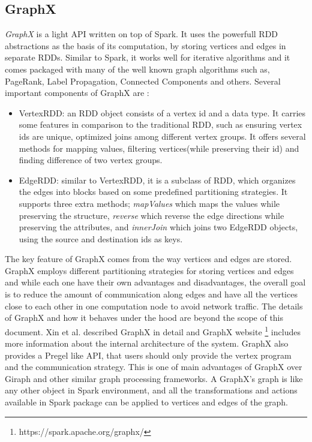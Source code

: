 \documentclass[english]{tktltiki}
\begin{document}
\subsection{GraphX}
\textit{GraphX} is a light API written on top of Spark. It uses the powerfull RDD abstractions as the basis of its computation, by storing vertices and edges in separate RDDs. Similar to Spark, it works well for iterative algorithms and it comes packaged with many of the well known graph algorithms such as, PageRank, Label Propagation, Connected Components and others.  Several important components of GraphX are :
\begin{itemize}
\item VertexRDD: an RDD object consists of a vertex id and a data type. It carries some features in comparison to the traditional RDD, such as ensuring vertex ids are unique, optimized joins among different vertex groups. It offers several methods for mapping values, filtering vertices(while preserving their id) and finding difference of two vertex groups.
\item EdgeRDD: similar to VertexRDD, it is a subclass of RDD, which organizes the edges into blocks based on some predefined partitioning strategies. It supports three extra methods; \textit{mapValues} which maps the values while preserving the structure, \textit{reverse} which reverse the edge directions while preserving the attributes, and \textit{innerJoin} which joins two EdgeRDD objects, using the source and destination ids as keys. 
\end{itemize}
The key feature of GraphX comes from the way vertices and edges are stored. GraphX employs different partitioning strategies for storing vertices and edges and while each one have their own advantages and disadvantages, the overall goal is to reduce the amount of communication along edges and have all the vertices close to each other in one computation node to avoid network traffic. The details of GraphX and how it behaves under the hood are beyond the scope of this document. Xin et al. \cite{xin13} described GraphX in detail and GraphX website  \footnote{https://spark.apache.org/graphx/} includes more information about the internal architecture of the system.
GraphX also provides a Pregel like API, that users should only provide the vertex program and the communication strategy. This is one of main advantages of GraphX over Giraph and other similar graph processing frameworks. A GraphX's graph is like any other object in Spark environment, and all the transformations and actions available in Spark package can be applied to vertices and edges of the graph. 
\end{document}
